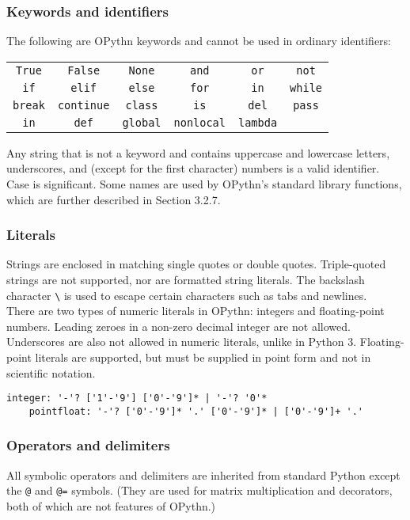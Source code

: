 \documentclass[11pt, twoside]{article}
\newcommand{\ms}{\texttt}
\begin{document}
    \subsubsection{Keywords and identifiers}
    The following are OPythn keywords and cannot be used in ordinary identifiers:
    \begin{center}
        \begin{tabular}{cccccc}
            \ms{True} & \ms{False} & \ms{None} & \ms{and} & \ms{or} & \ms{not}\\
            \ms{if} & \ms{elif} & \ms{else} & \ms{for} & \ms{in} & \ms{while}\\
            \ms{break} & \ms{continue} & \ms{class} & \ms{is} & \ms{del} & \ms{pass}\\
            \ms{in} & \ms{def} &\ms{global} & \ms{nonlocal} & \ms{lambda} &
    \end{tabular}
    \end{center}
    Any string that is not a keyword and contains uppercase and lowercase letters, underscores, and (except for the first character) numbers is a valid identifier. Case is significant. Some names are used by OPythn's standard library functions, which are further described in Section 3.2.7.
    \subsubsection{Literals}
    Strings are enclosed in matching single quotes or double quotes. Triple-quoted strings are not supported, nor are formatted string literals. The backslash character \ms{\textbackslash} is used to escape certain characters such as tabs and newlines.\\
    \indent There are two types of numeric literals in OPythn: integers and floating-point numbers. Leading zeroes in a non-zero decimal integer are not allowed. Underscores are also not allowed in numeric literals, unlike in Python 3. Floating-point literals are supported, but must be supplied in point form and not in scientific notation.
    \begin{lstlisting}[language=caml]
    integer: '-'? ['1'-'9'] ['0'-'9']* | '-'? '0'*
    pointfloat: '-'? ['0'-'9']* '.' ['0'-'9']* | ['0'-'9']+ '.'
    \end{lstlisting}
    \subsubsection{Operators and delimiters}
    All symbolic operators and delimiters are inherited from standard Python except the \ms{@} and \ms{@=} symbols. (They are used for matrix multiplication and decorators, both of which are not features of OPythn.)
\end{document}
